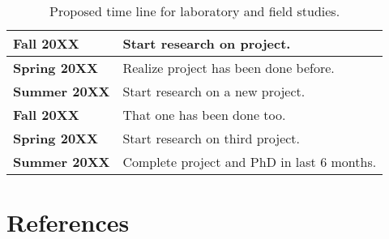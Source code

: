 \renewcommand{\arraystretch}{2}
\begin{table}
	\begin{center}
	\begin{tabular}{|l|p{13cm}|}
	\hline
 \textbf{Fall 20XX} &\parbox{13cm}{Start research on project.} \\
	\hline
 \textbf{Spring 20XX}&  \parbox{13cm}{Realize project has been done before.}\\
	\hline
 \textbf{Summer 20XX}& \parbox{13cm}{Start research on a new project.}\\
	\hline
 \textbf{Fall 20XX}&\parbox{13cm}{That one has been done too.}\\
	\hline
 \textbf{Spring 20XX}&\parbox{13cm}{Start research on third project.}\\
	\hline
 \textbf{Summer 20XX} &\parbox{13cm}{Complete project and PhD in last 6 months.}\\
	\hline
	\end{tabular}
	\end{center}
\caption{Proposed time line for laboratory and field studies.}
\label{timeline}
\end{table}


\clearpage
\section{References}
\singlespacing
\begingroup
 \def\chapter*#1{}


{} 

\endgroup





